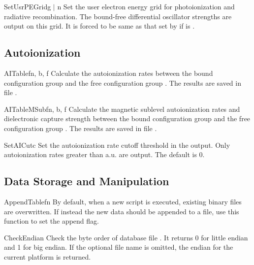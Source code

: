 \begin{fundesc}{SetUsrPEGrid}{g $\mid$ n}
Set the user electron energy grid for photoionization and radiative
recombination. The bound-free differential oscillator strengths are output on
this grid. It is forced to be same as that set by  if
 is .
\end{fundesc}


\subsection{Autoionization}

\begin{fundesc}{AITable}{fn, b, f}
Calculate the autoionization rates between the bound configuration group
 and the free configuration group . The results are saved in
file .
\end{fundesc}

\begin{fundesc}{AITableMSub}{fn, b, f}
Calculate the magnetic sublevel autoionization rates and dielectronic capture
strength between the bound configuration group  and the free
configuration group . The results are saved in file .
\end{fundesc}

\begin{fundesc}{SetAICut}{c}
Set the autoionization rate cutoff threshold in the output. Only
autoionization rates greater than  a.u. are output. The default is 0.
\end{fundesc}


\subsection{Data Storage and Manipulation}

\begin{fundesc}{AppendTable}{fn}
By default, when a new script is executed, existing binary files are
overwritten. If instead the new data should be appended to a file, use
this function to set the append flag.
\end{fundesc}

\begin{fundesc}{CheckEndian}{}
Check the byte order of database file . It returns 0 for little endian
and 1 for big endian. If the optional file name  is omitted, the
endian for the current platform is returned.
\end{fundesc}

